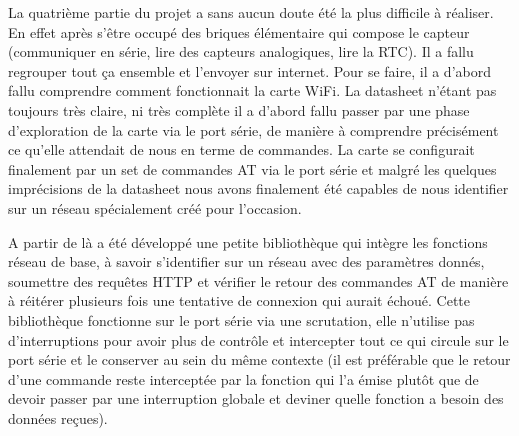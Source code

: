 		\par
		La quatrième partie du projet a sans aucun doute été la plus difficile à réaliser. En
		effet après s'être occupé des briques élémentaire qui compose le capteur (communiquer
		en série, lire des capteurs analogiques, lire la RTC). Il a fallu regrouper tout ça
		ensemble et l'envoyer sur internet. Pour se faire, il a d'abord fallu comprendre comment
		fonctionnait la carte WiFi. La datasheet n'étant pas toujours très claire, ni très complète
		il a d'abord fallu passer par une phase \og{} d'exploration \fg{} de la carte via le port
		série, de manière à comprendre précisément ce qu'elle attendait de nous en terme de commandes.
		La carte se configurait finalement par un set de commandes AT via le port série et malgré
		les quelques imprécisions de la datasheet nous avons finalement été capables de nous identifier
		sur un réseau spécialement créé pour l'occasion.
		
		\par
		A partir de là a été développé une petite bibliothèque qui intègre les fonctions réseau de base,
		à savoir s'identifier sur un réseau avec des paramètres donnés, soumettre des requêtes HTTP et
		vérifier le retour des commandes AT de manière à réitérer plusieurs fois une tentative de connexion
		qui aurait échoué. Cette bibliothèque fonctionne sur le port série via une scrutation, elle n'utilise
		pas d'interruptions pour avoir plus de contrôle et intercepter tout ce qui circule sur le port série
		et le conserver au sein du même contexte (il est préférable que le retour d'une commande reste interceptée
		par la fonction qui l'a émise plutôt que de devoir passer par une interruption globale et deviner
		quelle fonction a besoin des données reçues).
		
